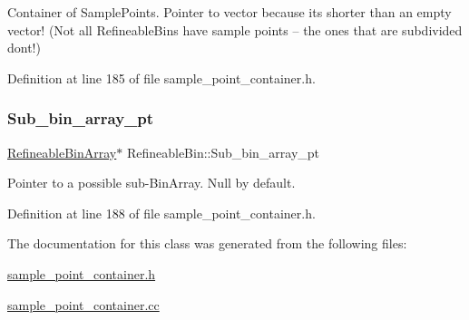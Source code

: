 Container of Sample\+Points. Pointer to vector because it\textquotesingle{}s shorter than an empty vector! (Not all Refineable\+Bins have sample points -- the ones that are subdivided don\textquotesingle{}t!) 



Definition at line 185 of file sample\+\_\+point\+\_\+container.\+h.

\mbox{\label{classRefineableBin_a6ef2b185fee14608f5adc423b266e1f7}} 
\subsubsection{\texorpdfstring{Sub\+\_\+bin\+\_\+array\+\_\+pt}{Sub\_bin\_array\_pt}}
{\footnotesize\ttfamily \hyperlink{classRefineableBinArray}{Refineable\+Bin\+Array}$\ast$ Refineable\+Bin\+::\+Sub\+\_\+bin\+\_\+array\+\_\+pt\hspace{0.3cm}{\ttfamily [protected]}}



Pointer to a possible sub-\/\+Bin\+Array. Null by default. 



Definition at line 188 of file sample\+\_\+point\+\_\+container.\+h.



The documentation for this class was generated from the following files\+:\begin{DoxyCompactItemize}
\item 
\hyperlink{sample__point__container_8h}{sample\+\_\+point\+\_\+container.\+h}\item 
\hyperlink{sample__point__container_8cc}{sample\+\_\+point\+\_\+container.\+cc}\end{DoxyCompactItemize}
